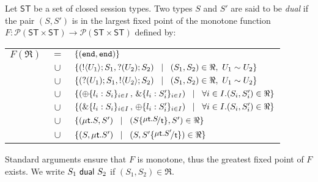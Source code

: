 \begin{definition}[Duality]
\label{def:dual}
Let $\mathsf{ST}$ be a set of closed session types. 
Two types $S$ and $S'$ are said to be {\em dual} if the pair $(S,S')$ is 
in the largest fixed point of the monotone function
$F:\mathcal{P}(\mathsf{ST}\times \mathsf{ST}) \to 
\mathcal{P}(\mathsf{ST}\times \mathsf{ST})$ defined by:\\ %
\begin{tabular}{rcl}
$F(\Re)$ &$\!\!=\!\!$&	$\{(\mathtt{end}, \mathtt{end})\}$\\
         &$\!\!\cup\!\!$&	$\{(! \langle U_1 \rangle ; S_1, ? (U_2) ; S_2)
\;\;\;|\;\;\;(S_1, S_2)\in \Re, \  U_1 \sim U_2 \}$\\ 
       &$\!\!\cup\!\!$&	$\{(? (U_1) ; S_1, ! \langle U_2 \rangle ; S_2)
\;\;\;|\;\;\;(S_1, S_2)\in \Re, \ U_1 \sim U_2\}$\\ 
	&$\!\!\cup\!\!$&	$\{(\oplus \{l_i: S_i\}_{i \in I} \,,\, \& \{l_i: S_i'\}_{i \in I}) \;\;\;|\;\;\; \forall i\in I. (S_i, S_i')\in \Re\}$\\
	&$\!\!\cup\!\!$&	$\{(\& \{l_i: S_i\}_{i \in I}\,,\, \oplus \{l_i: S_i'\}_{i \in I}) \;\;\;|\;\;\; \forall i\in I. (S_i, S_i')\in \Re\}$\\
	&$\!\!\cup\!\!$&	$\set{(\trec{t}{S}, S')
\bnfbar (S\subst{\trec{t}{S}}{\vart{t}},S')\in \Re}$\\
	&$\!\!\cup\!\!$&	$\set{(S,\trec{t}{S'})
\bnfbar (S,S'\subst{\trec{t}{S'}}{\vart{t}})\in \Re}$\\[1mm]
\end{tabular}

\noindent
Standard arguments ensure that $F$ is monotone, thus the greatest fixed point
of $F$ exists. We write $S_1 \ \mathsf{dual}\  S_2$ if  $(S_1,S_2)\in \Re$. 
\end{definition}


